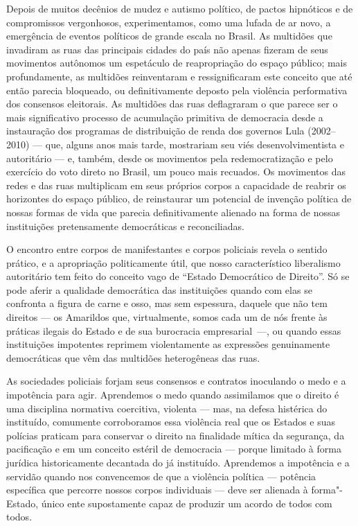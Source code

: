 \asterisc

Depois de muitos decênios de mudez e autismo político, de pactos
hipnóticos e de compromissos vergonhosos, experimentamos, como uma
lufada de ar novo, a emergência de eventos políticos de grande escala no
Brasil. As multidões que invadiram as ruas das principais cidades do
país não apenas fizeram de seus movimentos autônomos um espetáculo de
reapropriação do espaço público; mais profundamente, as multidões
reinventaram e ressignificaram este conceito que até então parecia
bloqueado, ou definitivamente deposto pela violência performativa dos
consensos eleitorais. As multidões das ruas deflagraram o que parece ser
o mais significativo processo de acumulação primitiva de democracia
desde a instauração dos programas de distribuição de renda dos governos
Lula (2002--2010) --- que, alguns anos mais tarde, mostrariam seu
viés desenvolvimentista e autoritário --- e, também, desde os movimentos
pela redemocratização e pelo exercício do voto direto no Brasil, um
pouco mais recuados. Os movimentos das redes e das ruas multiplicam em
seus próprios corpos a capacidade de reabrir os horizontes do espaço
público, de reinstaurar um potencial de invenção política de nossas
formas de vida que parecia definitivamente alienado na forma de nossas
instituições pretensamente democráticas e reconciliadas.

O encontro entre corpos de manifestantes e corpos policiais revela o
sentido prático, e a apropriação politicamente útil, que nosso
característico liberalismo autoritário tem feito do conceito vago de
``Estado Democrático de Direito''. Só se pode aferir a qualidade
democrática das instituições quando com elas se confronta a figura de
carne e osso, mas sem espessura, daquele que não tem direitos --- os
Amarildos que, virtualmente, somos cada um de nós frente às práticas
ilegais do Estado e de sua burocracia empresarial~---, ou quando essas
instituições impotentes reprimem violentamente as expressões
genuinamente democráticas que vêm das multidões heterogêneas das ruas.

As sociedades policiais forjam seus consensos e contratos inoculando o
medo e a impotência para agir. Aprendemos o medo quando assimilamos que
o direito é uma disciplina normativa coercitiva, violenta --- mas, na
defesa histérica do instituído, comumente corroboramos essa violência
real que os Estados e suas polícias praticam para conservar o direito na
finalidade mítica da segurança, da pacificação e em um conceito estéril
de democracia --- porque limitado à forma jurídica historicamente
decantada do já instituído. Aprendemos a impotência e a servidão quando
nos convencemos de que a violência política --- potência específica que
percorre nossos corpos individuais --- deve ser alienada à forma"-Estado,
único ente supostamente capaz de produzir um acordo de todos com todos.

